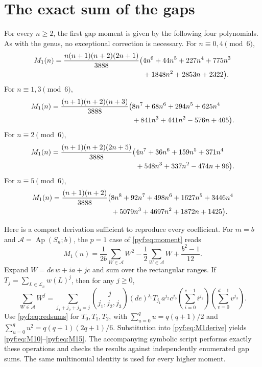 \documentclass[11pt,a4paper]{article}
\numberwithin{equation}{section}
\theoremstyle{definition}
\newcommand{\Ap}{\operatorname{Ap}}
\begin{document}
\appendix
\section{The exact sum of the gaps}\label{pyf:app:firstmoment}

For every $n\geq2$, the first gap moment is given by the following four
polynomials. As with the genus, no exceptional correction is necessary.
For $n\equiv0,4\pmod6$,
\begin{align}\label{pyf:eq:M10}
M_1(n)=\frac{n(n+1)(n+2)(2n+1)}{3888}\bigl(&4n^6+44n^5+227n^4
 +775n^3\notag\\&+1848n^2+2853n+2322\bigr).
\end{align}
For $n\equiv1,3\pmod6$,
\begin{align}\label{pyf:eq:M11}
M_1(n)=\frac{(n+1)(n+2)(n+3)}{3888}\bigl(&8n^7+68n^6+294n^5
 +625n^4\notag\\&+841n^3+441n^2-576n+405\bigr).
\end{align}
For $n\equiv2\pmod6$,
\begin{align}\label{pyf:eq:M12}
M_1(n)=\frac{(n+1)(n+2)(2n+5)}{3888}\bigl(&4n^7+36n^6+159n^5
 +371n^4\notag\\&+548n^3+337n^2-474n+96\bigr).
\end{align}
For $n\equiv5\pmod6$,
\begin{align}\label{pyf:eq:M15}
M_1(n)=\frac{(n+1)(n+2)}{3888}\bigl(&8n^8+92n^7+498n^6+1627n^5
 +3446n^4\notag\\&+5079n^3+4697n^2+1872n+1425\bigr).
\end{align}

Here is a compact derivation sufficient to reproduce every coefficient.
For $m=b$ and $\mathcal A=\Ap(S_n;b)$, the $p=1$ case of
\eqref{pyf:eq:moment} reads
\begin{equation}\label{pyf:eq:M1derive}
M_1(n)=\frac1{2b}\sum_{W\in\mathcal A}W^2
        -\frac12\sum_{W\in\mathcal A}W+\frac{b^2-1}{12}.
\end{equation}
Expand $W=de\,w+ia+jc$ and sum over the rectangular ranges. If
$T_j=\sum_{L\in\mathcal L_n}w(L)^j$, then for any $j\geq0$,
\begin{equation}\label{pyf:eq:liftsums}
\sum_{W\in\mathcal A}W^j
=\sum_{j_1+j_2+j_3=j}\binom{j}{j_1,j_2,j_3}
 (de)^{j_1}T_{j_1}a^{j_2}c^{j_3}
 \left(\sum_{i=0}^{e-1}i^{j_2}\right)
 \left(\sum_{v=0}^{d-1}v^{j_3}\right).
\end{equation}
Use \eqref{pyf:eq:redsums} for $T_0,T_1,T_2$, with
$\sum_{u=0}^q u=q(q+1)/2$ and
$\sum_{u=0}^q u^2=q(q+1)(2q+1)/6$.
Substitution into \eqref{pyf:eq:M1derive} yields
\eqref{pyf:eq:M10}--\eqref{pyf:eq:M15}. The accompanying symbolic script performs
exactly these operations and checks the results against independently
enumerated gap sums. The same multinomial identity is used for every
higher moment.
\end{document}
